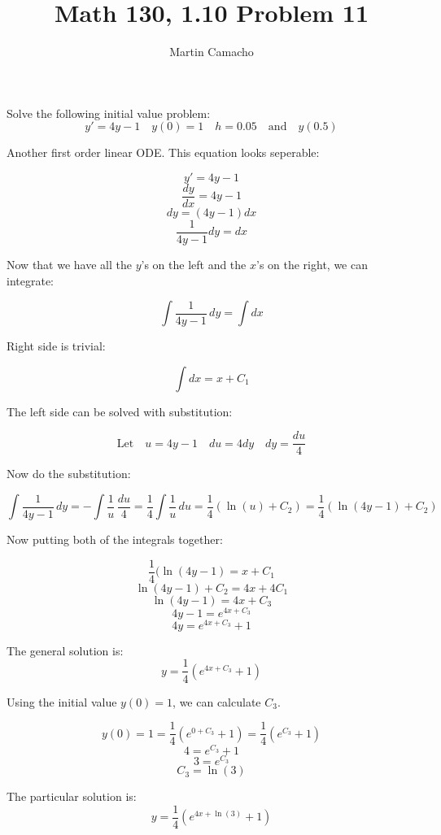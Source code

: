 \documentclass{article}
\begin{document}
\title{Math 130, 1.10 Problem 11}

\author{Martin Camacho}
\maketitle

Solve the following initial value problem:
\[ 
  y' = 4y - 1 \quad
  y(0) = 1  \quad h = 0.05 \quad \textrm{and} \quad y(0.5)
\]

Another first order linear ODE. This equation looks seperable:

\[y' = 4y - 1\]
\[\frac{dy}{dx} = 4y - 1\]
\[dy = (4y - 1)dx\]
\[\frac{1}{4y - 1}dy = dx\]

Now that we have all the \(y\)'s on the left and the \(x\)'s on the right, we can integrate:

\[ \int \frac{1}{4y - 1} \,dy = \int dx \]

Right side is trivial:

\[\int dx = x + C_1\]

The left side can be solved with substitution:

\[\textrm{Let} \quad u = 4y - 1 \quad du = 4dy \quad dy = \frac{du}{4}\]

Now do the substitution:

\[\int \frac{1}{4y - 1} \,dy = -\int \frac{1}{u} \,\frac{du}{4} = \frac{1}{4}\int \frac{1}{u} \,du = \frac{1}{4}(\ln(u) + C_2) = \frac{1}{4}(\ln(4y -1) + C_2)\]

Now putting both of the integrals together:

\[\frac{1}{4}(\ln(4y -1) = x + C_1\]
\[\ln(4y -1) + C_2 = 4x + 4C_1\]
\[\ln(4y -1) = 4x + C_3\]
\[4y - 1 = e^{4x + C_3}\]
\[4y = e^{4x + C_3} +1 \]

The general solution is:
\[y = \frac{1}{4}(e^{4x + C_3} +1 )\]

Using the initial value  \(y(0) = 1\), we can calculate  \(C_3\).

\[y(0) = 1 = \frac{1}{4}(e^{0 + C_3} +1 ) = \frac{1}{4}(e^{C_3} +1 )\]
\[4 = e^{C_3} + 1\]
\[3 = e^{C_3}\]
\[C_3 = \ln(3)\]

The particular solution is:
\[y = \frac{1}{4}(e^{4x + \ln(3)} +1 )\]
\end{document}
